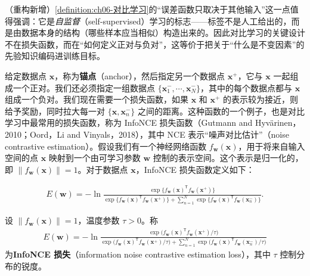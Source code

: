 \documentclass[../../main.tex]{subfiles}
\begin{document}
\begin{remark}（重构新增）\cref{definition:ch06-对比学习}的“误差函数只取决于其他输入”这一点值得强调：它是\emph{自监督}（self-supervised）学习的标志——标签不是人工给出的，而是由数据本身的结构（哪些样本应当相似）构造出来的。因此对比学习的关键设计不在损失函数，而在“如何定义正对与负对”，这等价于把关于“什么是不变因素”的先验知识编码进训练目标。
\end{remark}

给定数据点 $\boldsymbol{x}$，称为\textbf{锚点}（anchor），然后指定另一个数据点 $\boldsymbol{x}^{+}$，它与 $\boldsymbol{x}$ 一起组成一个正对。我们还必须指定一组数据点 $\{\boldsymbol{x}_1^{-},\cdots,\boldsymbol{x}_N^{-}\}$，其中的每个数据点都与 $\boldsymbol{x}$ 组成一个负对。我们现在需要一个损失函数，如果 $\boldsymbol{x}$ 和 $\boldsymbol{x}^{+}$ 的表示较为接近，则给予奖励，同时拉大每一对 $\{\boldsymbol{x},\boldsymbol{x}_n^{-}\}$ 之间的距离。这种函数的一个例子，也是对比学习中最常用的损失函数，称为 InfoNCE 损失函数（Gutmann and Hyvärinen，2010；Oord，Li and Vinyals，2018），其中 NCE 表示“噪声对比估计”（noise contrastive estimation）。假设我们有一个神经网络函数 $f_{\boldsymbol{w}}(\boldsymbol{x})$，用于将来自输入空间的点 $\boldsymbol{x}$ 映射到一个由可学习参数 $\boldsymbol{w}$ 控制的表示空间。这个表示是归一化的，即 $\|f_{\boldsymbol{w}}(\boldsymbol{x})\|=1$。对于数据点 $\boldsymbol{x}$，InfoNCE 损失函数定义如下：

\begin{align}
E(\boldsymbol{w})=-\ln\frac{\exp\bigl\{f_{\boldsymbol{w}}(\boldsymbol{x})^{\mathsf T}f_{\boldsymbol{w}}(\boldsymbol{x}^{+})\bigr\}}{\exp\bigl\{f_{\boldsymbol{w}}(\boldsymbol{x})^{\mathsf T}f_{\boldsymbol{w}}(\boldsymbol{x}^{+})\bigr\}+\sum_{n=1}^{N}\exp\bigl\{f_{\boldsymbol{w}}(\boldsymbol{x})^{\mathsf T}f_{\boldsymbol{w}}(\boldsymbol{x}_n^{-})\bigr\}}.
\label{align:ch06-InfoNCE}
\end{align}

\begin{definition}[InfoNCE 损失]\label{definition:ch06-InfoNCE}
设 $\|f_{\boldsymbol{w}}(\boldsymbol{x})\|=1$，温度参数 $\tau>0$。称
\begin{align}
E(\boldsymbol{w})=-\ln\frac{\exp\bigl(f_{\boldsymbol{w}}(\boldsymbol{x})^{\mathsf T}f_{\boldsymbol{w}}(\boldsymbol{x}^{+})/\tau\bigr)}{\exp\bigl(f_{\boldsymbol{w}}(\boldsymbol{x})^{\mathsf T}f_{\boldsymbol{w}}(\boldsymbol{x}^{+})/\tau\bigr)+\sum_{n=1}^{N}\exp\bigl(f_{\boldsymbol{w}}(\boldsymbol{x})^{\mathsf T}f_{\boldsymbol{w}}(\boldsymbol{x}_n^{-})/\tau\bigr)}
\label{align:ch06-InfoNCE温度}
\end{align}
为\textbf{InfoNCE 损失}（information noise contrastive estimation loss），其中 $\tau$ 控制分布的锐度。
\end{definition}
\end{document}
